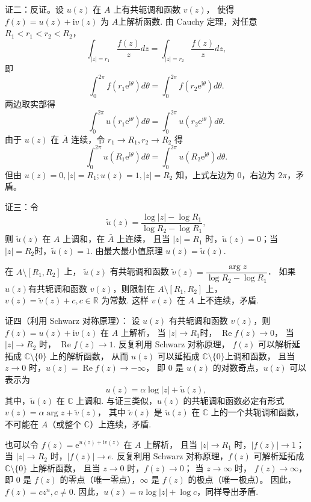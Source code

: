 \begin{enumerate}
证二：反证。设 $u(z)$ 在 $A$ 上有共轭调和函数 $v(z)$，
使得 $f(z)=u(z)+\mathrm{i} v(z)$ 为 $A$上解析函数. 
由 Cauchy 定理，对任意 $R_{1}<r_{1}<r_{2}<R_{2}$，
$$\int_{|z|=r_{1}} \frac{f(z)}{z} d z=\int_{|z|=r_{2}} \frac{f(z)}{z} d z,$$
即$$\int_{0}^{2 \pi} f(r_{1} \mathrm{e}^{\mathrm{i} \theta}) d \theta
=\int_{0}^{2 \pi} f(r_{2} \mathrm{e}^{\mathrm{i} \theta}) d \theta.$$
两边取实部得
$$\int_{0}^{2 \pi} u(r_{1} \mathrm{e}^{\mathrm{i} \theta}) d \theta
=\int_{0}^{2 \pi} u(r_{2} \mathrm{e}^{\mathrm{i} \theta}) d \theta.$$
由于 $u(z)$ 在 $\bar{A}$ 连续，令 $r_{1} \rightarrow R_{1}, r_{2} \rightarrow R_{2}$ 得
$$\int_{0}^{2 \pi} u(R_{1} \mathrm{e}^{\mathrm{i} \theta}) d \theta
=\int_{0}^{2 \pi} u(R_{2} \mathrm{e}^{\mathrm{i} \theta}) d \theta.$$
但由 $u(z)=0,|z|=R_{1} ; u(z)=1,|z|=R_{2}$ 知，上式左边为 $0$，右边为 $2 \pi$，矛盾。

证三：令
$$\tilde{u}(z)=\frac{\log |z|-\log R_{1}}{\log R_{2}-\log R_{1}},$$
则 $\tilde{u}(z)$ 在 $A$ 上调和，在 $\bar{A}$ 上连续，
且当 $|z|=R_{1}$ 时，$\tilde{u}(z)=0$；当 $|z|=R_{2}$时，$\tilde{u}(z)=1$. 
由最大最小值原理 $u(z)=\tilde{u}(z)$.

在 $A \setminus [R_{1}, R_{2}]$ 上，
$\tilde{u}(z)$ 有共轭调和函数 $\tilde{v}(z)=\dfrac{\arg z}{\log R_{2}-\log R_{1}}$．
如果 $u(z)$有共轭调和函数 $v(z)$，则限制在 $A \setminus [R_{1}, R_{2}]$ 上，
$v(z)=\tilde{v}(z)+c, c \in \mathbb{R}$ 为常数. 这样 $v(z)$ 在 $A$ 上不连续，矛盾.

证四（利用 Schwarz 对称原理）：
设 $u(z)$ 有共轭调和函数 $v(z)$，则 $f(z)=u(z)+\mathrm{i} v(z)$ 在 $A$ 上解析，
当 $|z| \rightarrow R_{1}$时， $\operatorname{Re} f(z) \rightarrow 0$，
当 $|z| \rightarrow R_{2}$ 时， $\operatorname{Re} f(z) \rightarrow 1$. 
反复利用 Schwarz 对称原理， $f(z)$ 可以解析延拓成 $\mathbb{C} \setminus\{0\}$ 上的解析函数，
从而 $u(z)$ 可以延拓成 $\mathbb{C} \setminus \{0\}$上调和函数，
且当 $z \rightarrow 0$ 时，$u(z)=\operatorname{Re} f(z) \rightarrow-\infty$，
即 $0$ 是 $u(z)$ 的对数奇点，$u(z)$ 可以表示为
$$u(z)=\alpha \log |z|+\tilde{u}(z),$$
其中，$\tilde{u}(z)$ 在 $\mathbb{C}$ 上调和. 
与证三类似，$u(z)$ 的共轭调和函数必定有形式 $v(z)=\alpha \arg z+\tilde{v}(z)$，
其中 $\tilde{v}(z)$ 是 $\tilde{u}(z)$ 在 $\mathbb{C}$ 上的一个共轭调和函数，
不可能在 $A$（或整个 $\mathbb{C}$）上连续，矛盾.

也可以令 $f(z)=\mathrm{e}^{u(z)+\mathrm{i} v(z)}$ 在 $A$ 上解析，
且当 $|z| \rightarrow R_{1}$ 时，$|f(z)| \rightarrow 1$；
当 $|z| \rightarrow R_{2}$ 时，$|f(z)| \rightarrow e$. 
反复利用 Schwarz 对称原理，$f(z)$ 可解析延拓成 $\mathbb{C} \setminus \{0\}$ 上解析函数，
且当 $z \rightarrow 0$ 时，$f(z) \rightarrow 0$；
当 $z \rightarrow \infty$ 时， $f(z) \rightarrow \infty$，
即 $0$ 是 $f(z)$ 的零点（唯一零点），$\infty$ 是 $f(z)$ 的极点（唯一极点）。
因此，$f(z)=c z^{n}, c \neq 0$. 因此，$u(z)=n \log |z|+\log c$，同样导出矛盾.


\end{enumerate}
